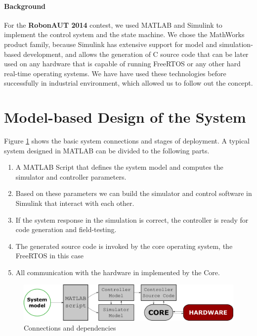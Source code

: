 \paragraph{Background}

For the \textbf{RobonAUT 2014} contest, we used \textsf{MATLAB} and \textsf{Simulink} to implement the control system and the state machine. We chose the \textsf{MathWorks} product family, because \textsf{Simulink} has extensive support for model and simulation-based development, and allows the generation of \textsf{C} source code that can be later used on any hardware that is capable of running \textsf{FreeRTOS} or any other hard real-time operating systems. We have have used these technologies before successfully in industrial environment, which allowed us to follow out the concept.

\section{Model-based Design of the System}


Figure \ref{fig:architecture} shows the basic system connections and stages of deployment. A typical system designed in \textsf{MATLAB} can be divided to the following parts.

\begin{enumerate}
\item A \textsf{MATLAB} \textsf{Script} that defines the system model and computes the simulator and controller parameters.
\item Based on these parameters we can build the simulator and control software in \textsf{Simulink} that interact with each other.
\item If the system response in the simulation is correct, the controller is ready for code generation and field-testing.
\item The generated source code is invoked by the core operating system, the \textsf{FreeRTOS} in this case
\item All communication with the hardware in implemented by the Core.
\end{enumerate}

\begin{figure}[!ht]
    \centering
    \includegraphics[width=0.7\linewidth]{img/architecture}
    \caption{Connections and dependencies}
    \label{fig:architecture}
\end{figure}

